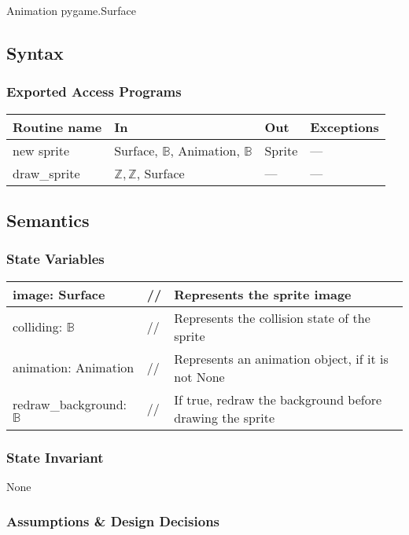 \documentclass[12pt]{article}
\begin{document}
Animation
pygame.Surface

\subsection* {Syntax}

\subsubsection* {Exported Access Programs}

\begin{tabular}{| l | l | l | l |}
\hline
\textbf{Routine name} & \textbf{In} & \textbf{Out} & \textbf{Exceptions}\\
\hline
new sprite & Surface, $\mathbb{B}$, Animation, $\mathbb{B}$ & Sprite & ---\\
\hline
draw\_sprite & $\mathbb{Z, Z}$, Surface & --- & ---\\
\hline
\end{tabular}

\subsection* {Semantics}

\subsubsection* {State Variables}
\begin{tabular}{lll}
\hline
image: Surface & // & Represents the sprite image\\
\hline
colliding: $\mathbb{B}$ & // & Represents the collision state of the sprite\\
\hline
animation: Animation & // & Represents an animation object, if it is not None\\
\hline
redraw\_background: $\mathbb{B}$ & // & If true, redraw the background before drawing the sprite\\
\end{tabular}

\subsubsection* {State Invariant}

None

\subsubsection* {Assumptions \& Design Decisions}
\end{document}

